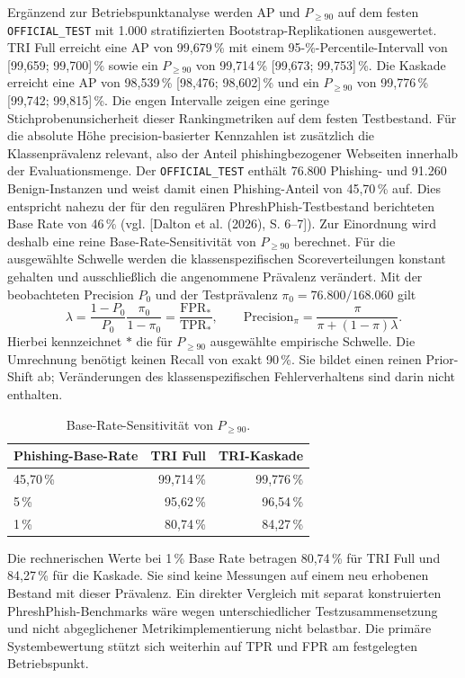 Ergänzend zur Betriebspunktanalyse werden AP und $P_{\geq 90}$ auf dem festen
\nolinkurl{OFFICIAL_TEST} mit 1.000 stratifizierten Bootstrap-Replikationen ausgewertet.
TRI Full erreicht eine AP von 99,679\,\% mit einem 95-\%-Percentile-Intervall von
[99,659; 99,700]\,\% sowie ein $P_{\geq 90}$ von 99,714\,\%
[99,673; 99,753]\,\%. Die Kaskade erreicht eine AP von 98,539\,\%
[98,476; 98,602]\,\% und ein $P_{\geq 90}$ von 99,776\,\%
[99,742; 99,815]\,\%. Die engen Intervalle zeigen eine geringe Stichprobenunsicherheit
dieser Rankingmetriken auf dem festen Testbestand. Für die absolute Höhe precision-basierter Kennzahlen ist zusätzlich die Klassenprävalenz
relevant, also der Anteil phishingbezogener Webseiten innerhalb der Evaluationsmenge. Der
\nolinkurl{OFFICIAL_TEST} enthält 76.800 Phishing- und 91.260 Benign-Instanzen und weist
damit einen Phishing-Anteil von 45,70\,\% auf. Dies entspricht nahezu der für den regulären
PhreshPhish-Testbestand berichteten Base Rate von 46\,\%
(vgl. [Dalton et al. (2026), S. 6--7]). Zur Einordnung wird deshalb eine reine
Base-Rate-Sensitivität von $P_{\geq 90}$ berechnet. Für die ausgewählte Schwelle
werden die klassenspezifischen Scoreverteilungen konstant gehalten und ausschließlich
die angenommene Prävalenz verändert. Mit der beobachteten Precision $P_0$ und
der Testprävalenz $\pi_0=76.800/168.060$ gilt
\[
\lambda=\frac{1-P_0}{P_0}\frac{\pi_0}{1-\pi_0}
       =\frac{\mathrm{FPR}_*}{\mathrm{TPR}_*},
\qquad
\mathrm{Precision}_{\pi}=\frac{\pi}{\pi+(1-\pi)\lambda}.
\]
Hierbei kennzeichnet $*$ die für $P_{\geq 90}$ ausgewählte empirische Schwelle.
Die Umrechnung benötigt keinen Recall von exakt 90\,\%. Sie bildet einen reinen
Prior-Shift ab; Veränderungen des klassenspezifischen Fehlerverhaltens sind darin
nicht enthalten.

\begin{table}[htbp]
\centering
\caption{Base-Rate-Sensitivität von $P_{\geq 90}$.}
\label{tab:base_rate_sensitivity}
\small
\begin{tabular}{lrr}
\toprule
Phishing-Base-Rate & TRI Full & TRI-Kaskade \\
\midrule
45,70\,\% & 99,714\,\% & 99,776\,\% \\
5\,\%     & 95,62\,\%  & 96,54\,\% \\
1\,\%     & 80,74\,\%  & 84,27\,\% \\
\bottomrule
\end{tabular}
\end{table}

Die rechnerischen Werte bei 1\,\% Base Rate betragen 80,74\,\% für TRI Full und
84,27\,\% für die Kaskade. Sie sind keine Messungen auf einem neu erhobenen Bestand
mit dieser Prävalenz. Ein direkter Vergleich mit separat konstruierten
PhreshPhish-Benchmarks wäre wegen unterschiedlicher Testzusammensetzung und nicht
abgeglichener Metrikimplementierung nicht belastbar. Die primäre Systembewertung
stützt sich weiterhin auf TPR und FPR am festgelegten Betriebspunkt.

